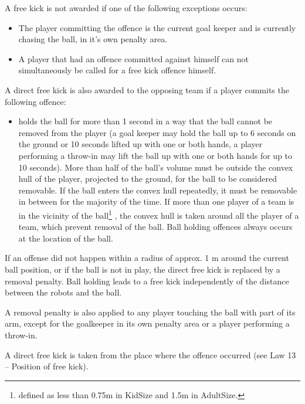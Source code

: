 A free kick is not awarded if one of the following exceptions occurs:
\begin{itemize}
    \item The player committing the offence is the current goal keeper and is currently chasing the ball, in it's own penalty area.
  \item A player that had an offence committed against himself can not simultaneously be called for a free kick offence himself.
\end{itemize}

\bigskip


A direct free kick is also awarded to the opposing team if a player commits
the following offence:

\begin{itemize}
  \item {}holds the ball for more than 1 second in a way that the
  ball cannot be removed from the player (a goal keeper may hold the ball up to
  6 seconds on the ground or 10 seconds lifted up with one or both hands,
    a player performing a throw-in may lift the ball up with one or both hands
    for up to 10 seconds). More than half of the ball's volume must be outside
  the convex hull of the player, projected to the ground, for the ball to be
  considered removable. If the ball enters the convex hull repeatedly, it must
  be removable in between for the majority of the time. If more than one player
  of a team is in the vicinity of the ball\footnote{
    defined as less than 0.75m in KidSize and 1.5m in AdultSize.}
  , the convex hull is taken around all
  the player of a team, which prevent removal of the ball.
  Ball holding offences always occurs at the location of the ball.
\end{itemize}

\bigskip

If an offense did not happen within a radius of approx. 1 m
around the current ball position, or if the ball is not in play,
the direct free kick is replaced by a removal penalty.
Ball holding leads to a free kick independently of the distance between
the robots and the ball.

\bigskip

A removal penalty is also applied to any player touching the ball with
part of its arm, except for the goalkeeper in its own penalty area or a player
performing a throw-in.


\bigskip


A direct free kick is taken from the place where the offence occurred (see Law 13 -- Position of free kick).


